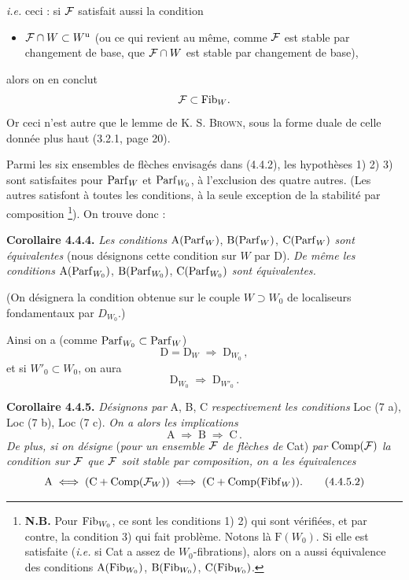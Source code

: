 \textit{i.e.} ceci : si $\mathcal{F}$ satisfait aussi la condition
\begin{itemize}[leftmargin=3em]
\item[4)] $\mathcal{F} \cap W \subset W^{\mathrm{u}}$ (ou ce qui revient au même, comme $\mathcal{F}$ est stable par changement de base, que $\mathcal{F} \cap W$ est stable par changement de base),
\end{itemize}
alors on en conclut
\[
\mathcal{F} \subset \mathrm{Fib}_W.
\]
Or ceci n'est autre que le lemme de K. S. \textsc{Brown}, sous la forme duale de celle donnée plus haut (3.2.1, page 20).

Parmi les six ensembles de flèches envisagés dans (4.4.2), les hypothèses 1) 2) 3) sont satisfaites pour $\mathrm{Parf}_W$ et $\mathrm{Parf}_{W_0}$, à l'exclusion des quatre autres. (Les autres satisfont à toutes les conditions, à la seule exception de la stabilité par composition \footnote[30]{\textbf{N.B.} Pour $\mathrm{Fib}_{W_0}$, ce sont les conditions 1) 2) qui sont vérifiées, et par contre, la condition 3) qui fait problème. Notons là $\mathrm{F}(W_0)$. Si elle est satisfaite (\textit{i.e.} si Cat a assez de $W_0$-fibrations), alors on a aussi équivalence des conditions $\mathrm{A}(\mathrm{Fib}_{W_0})$, $\mathrm{B}(\mathrm{Fib}_{W_0})$, $\mathrm{C}(\mathrm{Fib}_{W_0})$.}). On trouve donc :

\textbf{Corollaire 4.4.4.} \textit{Les conditions} $\mathrm{A}(\mathrm{Parf}_W)$, $\mathrm{B}(\mathrm{Parf}_W)$, $\mathrm{C}(\mathrm{Parf}_W)$ \textit{sont équivalentes} (nous désignons cette condition sur $W$ par D). \textit{De même les conditions} $\mathrm{A}(\mathrm{Parf}_{W_0})$, $\mathrm{B}(\mathrm{Parf}_{W_0})$, $\mathrm{C}(\mathrm{Parf}_{W_0})$ \textit{sont équivalentes.}


(On désignera la condition obtenue sur le couple $W \supset W_0$ de localiseurs fondamentaux par $D_{W_0}$.)

Ainsi on a (comme $\mathrm{Parf}_{W_0} \subset \mathrm{Parf}_W$)
\[
\mathrm{D} = \mathrm{D}_W \;\Longrightarrow\; \mathrm{D}_{W_0}\,,
\tag*{(4.4.4)}
\]
et si $W'_0 \subset W_0$, on aura
\[
\mathrm{D}_{W_0} \;\Longrightarrow\; \mathrm{D}_{W'_0}\,.
\tag*{(4.4.5)}
\]

\textbf{Corollaire 4.4.5.} \textit{Désignons par} A, B, C \textit{respectivement les conditions} Loc (7 a), Loc (7 b), Loc (7 c). \textit{On a alors les implications}
\[
\mathrm{A} \;\Longrightarrow\; \mathrm{B} \;\Longrightarrow\; \mathrm{C}\,.
\tag*{(4.4.5.1)}
\]
\textit{De plus, si on désigne} (\textit{pour un ensemble $\mathcal{F}$ de flèches de} Cat) \textit{par} $\mathrm{Comp}(\mathcal{F})$ \textit{la condition sur $\mathcal{F}$ que $\mathcal{F}$ soit stable par composition, on a les équivalences}
\[
\mathrm{A} \iff (\mathrm{C} + \mathrm{Comp}(\mathcal{F}_W)) \iff (\mathrm{C} + \mathrm{Comp}(\mathrm{Fibf}_W)).
\tag*{(4.4.5.2)}
\]

